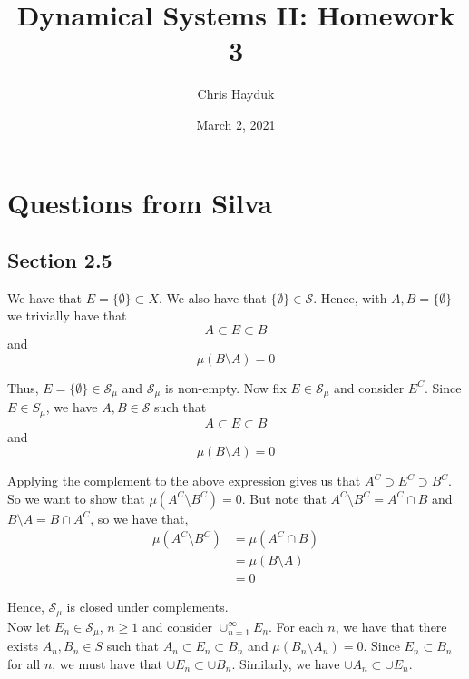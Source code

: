 \documentclass[12pt]{article}
\newenvironment{problem}[2][Problem]{\begin{trivlist}
\item[\hskip \labelsep {\bfseries #1}\hskip \labelsep {\bfseries #2.}]}{\end{trivlist}}
\begin{document}
\title{Dynamical Systems II: Homework 3}

\author{Chris Hayduk}
\date{March 2, 2021}

\maketitle

\section{Questions from Silva}

\subsection{Section 2.5}

\begin{problem}{14}
\end{problem}

We have that $E = \{\emptyset\} \subset X$. We also have that $\{\emptyset\} \in \mathcal{S}$. Hence, with $A, B = \{\emptyset\}$ we trivially have that $$A \subset E \subset B$$ and $$\mu(B \setminus A) = 0$$

Thus, $E = \{\emptyset\} \in \mathcal{S}_{\mu}$ and $\mathcal{S}_{\mu}$ is non-empty. Now fix $E \in \mathcal{S}_{\mu}$ and consider $E^C$. Since $E \in S_{\mu}$, we have $A, B \in \mathcal{S}$ such that $$A \subset E \subset B$$ and $$\mu(B \setminus A) = 0$$

Applying the complement to the above expression gives us that $A^C \supset E^C \supset B^C$. So we want to show that $\mu(A^C \setminus B^C) = 0$. But note that $A^C \setminus B^C = A^C \cap B$ and $B \setminus A = B \cap A^C$, so we have that,
\begin{align*}
\mu(A^C \setminus B^C) &= \mu(A^C \cap B)\\
&= \mu(B \setminus A)\\
&= 0
\end{align*}

Hence, $\mathcal{S}_{\mu}$ is closed under complements.\\

Now let $E_n \in \mathcal{S}_{\mu}$, $n \geq 1$ and consider $\cup_{n=1}^{\infty} E_n$. For each $n$, we have that there exists $A_n, B_n \in S$ such that $A_n \subset E_n \subset B_n$ and $\mu(B_n \setminus A_n) = 0$. Since $E_n \subset B_n$ for all $n$, we must have that $\cup E_n \subset \cup B_n$. Similarly, we have $\cup A_n \subset \cup E_n$.\\
\end{document}
